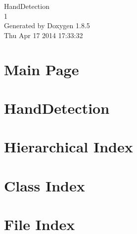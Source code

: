 \documentclass[twoside]{book}
\newcommand{\clearemptydoublepage}{%
  \newpage{\pagestyle{empty}\cleardoublepage}%
}
\begin{document}
\hypersetup{pageanchor=false}
\begin{titlepage}
\vspace*{7cm}
\begin{center}%
{\Large Hand\-Detection \\[1ex]\large 1 }\\
\vspace*{1cm}
{\large Generated by Doxygen 1.8.5}\\
\vspace*{0.5cm}
{\small Thu Apr 17 2014 17:33:32}\\
\end{center}
\end{titlepage}
\clearemptydoublepage
\tableofcontents
\clearemptydoublepage
{}
\hypersetup{pageanchor=true}

\chapter{Main Page}
\label{index}\hypertarget{index}{}
\chapter{Hand\-Detection}
\label{md___users_raphaeldendooven__documents_school_2013-2014__thesis__master__programs__hand_detection__r_e_a_d_m_e}
\hypertarget{md___users_raphaeldendooven__documents_school_2013-2014__thesis__master__programs__hand_detection__r_e_a_d_m_e}{}

\chapter{Hierarchical Index}

\chapter{Class Index}

\chapter{File Index}

\end{document}

